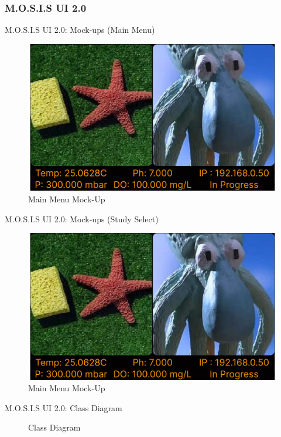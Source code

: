 \documentclass[14pt, aspectratio=169]{beamer}
\begin{document}
\subsubsection{M.O.S.I.S UI 2.0}
\begin{frame}{M.O.S.I.S UI 2.0: Mock-ups (Main Menu)}
	\begin{figure}
		\includegraphics[page=1,height=0.7\textheight]{../../Progress_Report_Document/Appendix/Design_Documentation/User_Interface/Figures/M.O.S.I.S_UI_Design.pdf}
		\caption{Main Menu Mock-Up}
	\end{figure}
\end{frame}
\begin{frame}{M.O.S.I.S UI 2.0: Mock-ups (Study Select)}
	\begin{figure}
		\includegraphics[page=2,height=0.7\textheight]{../../Progress_Report_Document/Appendix/Design_Documentation/User_Interface/Figures/M.O.S.I.S_UI_Design.pdf}
		\caption{Main Menu Mock-Up}
	\end{figure}
\end{frame}
\begin{frame}{M.O.S.I.S UI 2.0: Class Diagram}
	\begin{figure}
		\caption{Class Diagram}
	\end{figure}
\end{frame}
\end{document}
